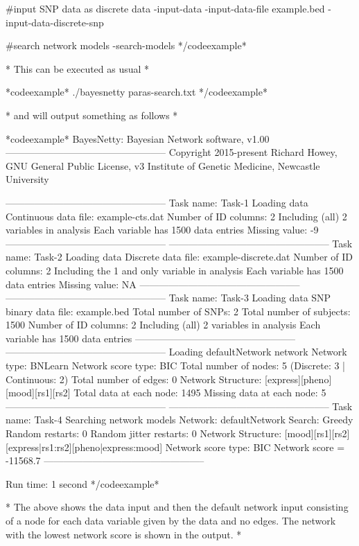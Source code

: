 #input SNP data as discrete data -input-data -input-data-file example.bed -input-data-discrete-snp

#search network models -search-models */codeexample*

* This can be executed as usual *

*codeexample* ./bayesnetty paras-search.txt */codeexample*

* and will output something as follows *

*codeexample* BayesNetty: Bayesian Network software, v1.00 -------------------------------------------------- Copyright 2015-present Richard Howey, GNU General Public License, v3 Institute of Genetic Medicine, Newcastle University

-------------------------------------------------- Task name: Task-1 Loading data Continuous data file: example-cts.dat Number of ID columns: 2 Including (all) 2 variables in analysis Each variable has 1500 data entries Missing value: -9 -------------------------------------------------- -------------------------------------------------- Task name: Task-2 Loading data Discrete data file: example-discrete.dat Number of ID columns: 2 Including the 1 and only variable in analysis Each variable has 1500 data entries Missing value: NA -------------------------------------------------- -------------------------------------------------- Task name: Task-3 Loading data SNP binary data file: example.bed Total number of SNPs: 2 Total number of subjects: 1500 Number of ID columns: 2 Including (all) 2 variables in analysis Each variable has 1500 data entries -------------------------------------------------- -------------------------------------------------- Loading defaultNetwork network Network type: BNLearn Network score type: BIC Total number of nodes: 5 (Discrete: 3 | Continuous: 2) Total number of edges: 0 Network Structure: [express][pheno][mood][rs1][rs2] Total data at each node: 1495 Missing data at each node: 5 -------------------------------------------------- -------------------------------------------------- Task name: Task-4 Searching network models Network: defaultNetwork Search: Greedy Random restarts: 0 Random jitter restarts: 0 Network Structure: [mood][rs1][rs2][express|rs1:rs2][pheno|express:mood] Network score type: BIC Network score = -11568.7 --------------------------------------------------

Run time: 1 second */codeexample*

* The above shows the data input and then the default network input consisting of a node for each data variable given by the data and no edges. The network with the lowest network score is shown in the output. *

